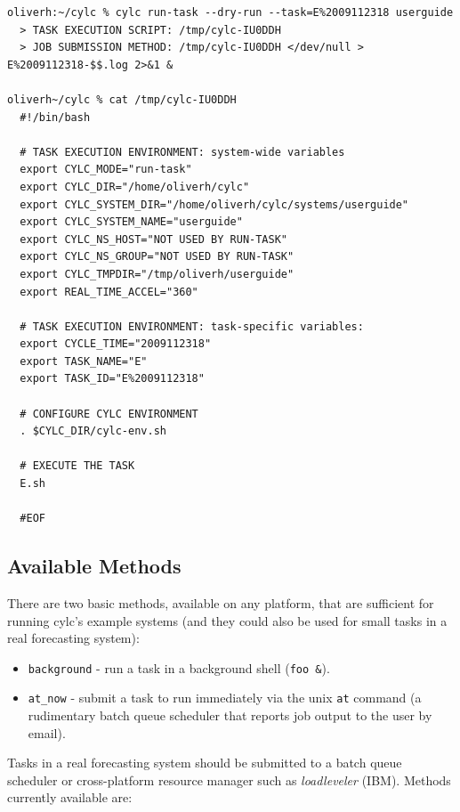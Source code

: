 \documentclass[11pt,a4paper]{article}
\begin{document}
\begin{lstlisting}
oliverh:~/cylc % cylc run-task --dry-run --task=E%2009112318 userguide
  > TASK EXECUTION SCRIPT: /tmp/cylc-IU0DDH
  > JOB SUBMISSION METHOD: /tmp/cylc-IU0DDH </dev/null > E%2009112318-$$.log 2>&1 &
  
oliverh~/cylc % cat /tmp/cylc-IU0DDH
  #!/bin/bash
  
  # TASK EXECUTION ENVIRONMENT: system-wide variables
  export CYLC_MODE="run-task"
  export CYLC_DIR="/home/oliverh/cylc"
  export CYLC_SYSTEM_DIR="/home/oliverh/cylc/systems/userguide"
  export CYLC_SYSTEM_NAME="userguide"
  export CYLC_NS_HOST="NOT USED BY RUN-TASK"
  export CYLC_NS_GROUP="NOT USED BY RUN-TASK"
  export CYLC_TMPDIR="/tmp/oliverh/userguide"
  export REAL_TIME_ACCEL="360"
  
  # TASK EXECUTION ENVIRONMENT: task-specific variables:
  export CYCLE_TIME="2009112318"
  export TASK_NAME="E"
  export TASK_ID="E%2009112318"
  
  # CONFIGURE CYLC ENVIRONMENT
  . $CYLC_DIR/cylc-env.sh
  
  # EXECUTE THE TASK
  E.sh 
  
  #EOF
\end{lstlisting}

\subsection{Available Methods}
\label{AvailableMethods}

\lstset{language=bash}

There are two basic methods, available on any platform, that are
sufficient for running cylc's example systems (and they could also be
used for small tasks in a real forecasting system): 

\begin{itemize}

    \item \lstinline=background= - run a task in a background shell
        (\lstinline=foo &=). 

     \item \lstinline=at_now= - submit a task to run immediately via the
         unix \lstinline=at= command (a rudimentary batch queue
         scheduler that reports job output to the user by email).

\end{itemize}

Tasks in a real forecasting system should be submitted to a batch queue
scheduler or cross-platform resource manager such as {\em loadleveler}
(IBM). Methods currently available are:
\end{document}
